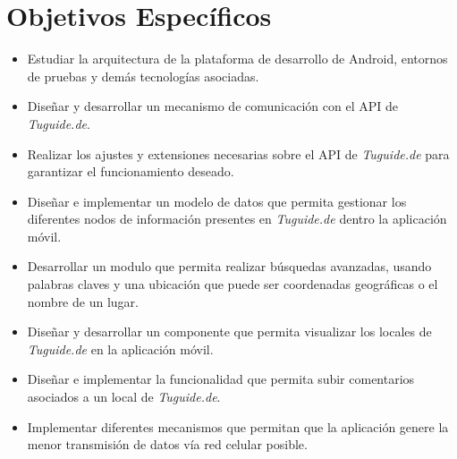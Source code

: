 \section{Objetivos Específicos} \label{sect:objetivos_especificos}

\begin{itemize}
\item Estudiar la arquitectura de la plataforma de desarrollo de Android, entornos de pruebas y demás tecnologías asociadas.
\item Diseñar y desarrollar un mecanismo de comunicación con el API de \textit{Tuguide.de}.
\item Realizar los ajustes y extensiones necesarias sobre el API de \textit{Tuguide.de} para garantizar el funcionamiento deseado.
\item Diseñar e implementar un modelo de datos que permita gestionar los diferentes nodos de información presentes en \textit{Tuguide.de} dentro la aplicación móvil. 
\item Desarrollar un modulo que permita realizar búsquedas avanzadas, usando palabras claves y una ubicación que puede ser coordenadas geográficas o el nombre de un lugar.
\item Diseñar y desarrollar un componente que permita visualizar los locales de \textit{Tuguide.de} en la aplicación móvil.  
\item Diseñar e implementar la funcionalidad que permita subir comentarios asociados a un local de \textit{Tuguide.de}.
\item Implementar diferentes mecanismos que permitan que la aplicación genere la menor transmisión de datos vía red celular posible.

\end{itemize}